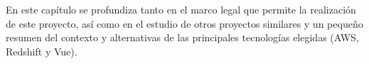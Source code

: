 
En este capítulo se profundiza tanto en el marco legal que permite la realización de este proyecto, así como en el estudio de otros proyectos similares y un pequeño resumen del contexto y alternativas de las principales tecnologías elegidas (AWS, Redshift y Vue).
